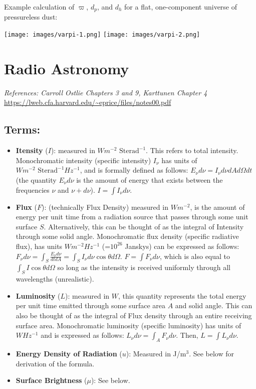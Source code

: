 \documentclass[12pt]{article}
\begin{document}
Example calculation of $\varpi$, $d_{p}$, and $d_{h}$ for a flat, one-component universe of pressureless dust: 

\begin{center}
\texttt{[image: images/varpi-1.png]}
\texttt{[image: images/varpi-2.png]}
\end{center}

\newpage
\section{Radio Astronomy}

\textit{References: Carroll Ostlie Chapters 3 and 9, Karttunen Chapter 4}\newline
\url{https://lweb.cfa.harvard.edu/~eprice/files/notes00.pdf}

\subsection{Terms:}
\begin{itemize}
\item \textbf{Itensity} ($I$): measured in $Wm^{-2}\text{ Sterad}^{-1}$. This refers to total intensity. Monochromatic intensity (specific intensity) $I_\nu$ has units of $Wm^{-2}\text{ Sterad}^{-1}Hz^{-1}$, and is formally defined as follows: $E_{\nu}d\nu = I_{\nu} d\nu dA d\Omega dt$ (the quantity $E_{\nu}d\nu$ is the amount of energy that exists between the frequencies $\nu$ and $\nu + d\nu$). $I = \int I_{\nu}d\nu$.
\item \textbf{Flux} ($F$): (technically Flux Density) measured in $Wm^{-2}$, is the amount of energy per unit time from a radiation source that passes through some unit surface $S$. Alternatively, this can be thought of as the integral of Intensity through some solid angle. Monochromatic flux density (specific radiative flux), has units $Wm^{-2}Hz^{-1}$ (=$10^{26}$ Janskys) can be expressed as follows: $F_{\nu} d\nu = \int_S \frac{E_{\nu}d\nu}{dt dA} = \int_S I_{\nu}d\nu \cos{\theta} d\Omega$. $F = \int F_{\nu}d\nu$, which is also equal to $\int_S I\cos{\theta}d\Omega$ so long as the intensity is received uniformly through all wavelengths (unrealistic).
\item \textbf{Luminosity} ($L$): measured in $W$, this quantity represents the total energy per unit time emitted through some surface area $A$ and solid angle. This can also be thought of as the integral of Flux density through an entire receiving surface area. Monochromatic luminosity (specific luminosity) has units of $WHz^{-1}$ and is expressed as follows: $L_{\nu}d\nu = \int_A F_{\nu}d\nu$. Then, $L = \int L_{\nu}d\nu$.
\item \textbf{Energy Density of Radiation} ($u$): Measured in J/m$^3$. See below for derivation of the formula.
\item \textbf{Surface Brightness} ($\mu$): See below.
\end{itemize}
\end{document}
